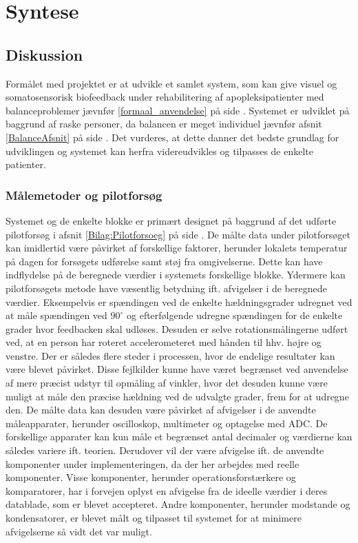 \chapter{Syntese}
\section{Diskussion}
Formålet med projektet er at udvikle et samlet system, som kan give visuel og somatosensorisk biofeedback under rehabilitering af apopleksipatienter med balanceproblemer jævnfør \ref{formaal_anvendelse} på side \pageref{formaal_anvendelse}. Systemet er udviklet på baggrund af raske personer, da balancen er meget individuel jævnfør afsnit \ref{BalanceAfsnit} på side \pageref{BalanceAfsnit}. Det vurderes, at dette danner det bedste grundlag for udviklingen og systemet kan herfra videreudvikles og tilpasses de enkelte patienter. 

\subsection{Målemetoder og pilotforsøg}
Systemet og de enkelte blokke er primært designet på baggrund af det udførte pilotforsøg i afsnit \ref{Bilag:Pilotforsoeg} på side \pageref{Bilag:Pilotforsoeg}. De målte data under pilotforsøget kan imidlertid være påvirket af forskellige faktorer, herunder lokalets temperatur på dagen for forsøgets udførelse samt støj fra omgivelserne. Dette kan have indflydelse på de beregnede værdier i systemets forskellige blokke.
Ydermere kan pilotforsøgets metode have væsentlig betydning ift. afvigelser i de beregnede værdier. Eksempelvis er spændingen ved de enkelte hældningsgrader udregnet ved at måle spændingen ved $90^{\circ}$ og efterfølgende udregne spændingen for de enkelte grader hvor feedbacken skal udløses. Desuden er selve rotationsmålingerne udført ved, at en person har roteret accelerometeret med hånden til hhv. højre og venstre. Der er således flere steder i processen, hvor de endelige resultater kan være blevet påvirket. Disse fejlkilder kunne have været begrænset ved anvendelse af mere præcist udstyr til opmåling af vinkler, hvor det desuden kunne være muligt at måle den præcise hældning ved de udvalgte grader, frem for at udregne den.  
De målte data kan desuden være påvirket af afvigelser i de anvendte måleapparater, herunder oscilloskop, multimeter og optagelse med ADC. De forskellige apparater kan kun måle et begrænset antal decimaler og værdierne kan således variere ift. teorien. Derudover vil der være afvigelse ift. de anvendte komponenter under implementeringen, da der her arbejdes med reelle komponenter. Visse komponenter, herunder operationsforstærkere og komparatorer, har i forvejen oplyst en afvigelse fra de ideelle værdier i deres datablade, som er blevet accepteret. Andre komponenter, herunder modstande og kondensatorer, er blevet målt og tilpasset til systemet for at minimere afvigelserne så vidt det var muligt. 

